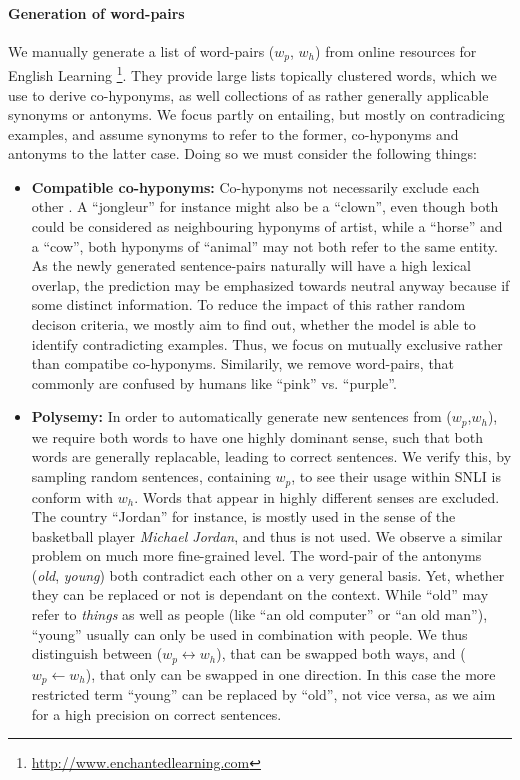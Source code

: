 \paragraph*{Generation of word-pairs}
We manually generate a list of word-pairs ($w_p$, $w_h$) from online resources for English Learning \footnote{\href{http://www.enchantedlearning.com}{http://www.enchantedlearning.com}}. They provide large lists topically clustered words, which we use to derive co-hyponyms, as well collections of as rather generally applicable synonyms or antonyms. We focus partly on entailing, but mostly on contradicing examples, and assume synonyms to refer to the former, co-hyponyms and antonyms to the latter case. Doing so we must consider the following things:
\begin{itemize}
\item \textbf{Compatible co-hyponyms:} Co-hyponyms not necessarily exclude each other \citep{kruszewski2015so}. A ``jongleur'' for instance might also be a ``clown'', even though both could be considered as neighbouring hyponyms of artist, while a ``horse'' and a ``cow'', both hyponyms of ``animal'' may not both refer to the same entity. As the newly generated sentence-pairs naturally will have a high lexical overlap, the prediction may be emphasized towards neutral anyway because if some distinct information. To reduce the impact of this rather random decison criteria, we mostly aim to find out, whether the model is able to identify contradicting examples. Thus, we focus on mutually exclusive rather than compatibe co-hyponyms. Similarily, we remove word-pairs, that commonly are confused by humans like ``pink'' vs. ``purple''. 
\item \textbf{Polysemy:} In order to automatically generate new sentences from ($w_p$,$w_h$), we require both words to have one highly dominant sense, such that both words are generally replacable, leading to correct sentences. We verify this, by sampling random sentences, containing $w_p$, to see their usage within \ac{SNLI} is conform with $w_h$. Words that appear in highly different senses are excluded. The country ``Jordan'' for instance, is mostly used in the sense of the basketball player \textit{Michael Jordan}, and thus is not used. We observe a similar problem on much more fine-grained level. The word-pair of the antonyms (\textit{old}, \textit{young}) both contradict each other on a very general basis. Yet, whether they can be replaced or not is dependant on the context. While ``old'' may refer to \textit{things} as well as people (like ``an old computer'' or ``an old man''), ``young'' usually can only be used in combination with people. We thus distinguish between ($w_p \leftrightarrow w_h$), that can be swapped both ways, and ($w_p \leftarrow w_h$), that only can be swapped in one direction. In this case the more restricted term ``young'' can be replaced by ``old'', not vice versa, as we aim for a high precision on correct sentences.

\end{itemize}
